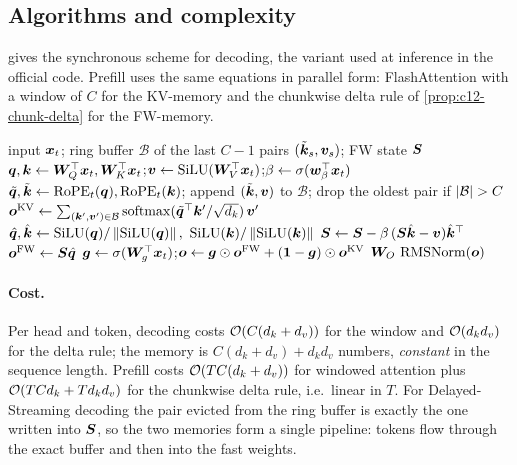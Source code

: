 \subsection{Algorithms and complexity}

 gives the synchronous scheme for decoding, the variant used at inference
in the official code. Prefill uses the same equations in parallel form: FlashAttention with a
window of $C$ for the KV-memory and the chunkwise delta rule of
\cref{prop:c12-chunk-delta} for the FW-memory.

\begin{algorithm}[t]
\caption{One decoding step of a synchronous HQLT head with dynamic vector mixing.}
\label{alg:c12-hqlt}
\begin{algorithmic}[1]
\Require input $\bm{x}_t$; ring buffer $\mathcal{B}$ of the last $C-1$ pairs $(\tilde{\bm{k}}_s,\bm{v}_s)$; FW state $\bm{S}$
\State $\bm{q},\bm{k} \gets \bm{W}_Q^{\top}\bm{x}_t, \bm{W}_K^{\top}\bm{x}_t$;\quad $\bm{v}\gets\operatorname{SiLU}(\bm{W}_V^{\top}\bm{x}_t)$;\quad $\beta\gets\sigma(\bm{w}_\beta^{\top}\bm{x}_t)$
\State $\tilde{\bm{q}},\tilde{\bm{k}} \gets \mathrm{RoPE}_t(\bm{q}), \mathrm{RoPE}_t(\bm{k})$; append $(\tilde{\bm{k}},\bm{v})$ to $\mathcal{B}$; drop the oldest pair if $\left\lvert \mathcal{B}\right\rvert>C$
\State $\bm{o}^{\mathrm{KV}} \gets \sum_{(\bm{k}',\bm{v}')\in\mathcal{B}}\operatorname{softmax}(\tilde{\bm{q}}^{\top}\bm{k}'/\sqrt{d_k})\,\bm{v}'$
\State $\hat{\bm{q}},\hat{\bm{k}} \gets \operatorname{SiLU}(\bm{q})/\left\lVert \operatorname{SiLU}(\bm{q})\right\rVert,\ \operatorname{SiLU}(\bm{k})/\left\lVert \operatorname{SiLU}(\bm{k})\right\rVert$
\State $\bm{S} \gets \bm{S} - \beta\,(\bm{S}\hat{\bm{k}} - \bm{v})\hat{\bm{k}}^{\top}$ \Comment{$=\mS(\mI-\beta\hat\vk\hat\vk\T)+\beta\vv\hat\vk\T$}
\State $\bm{o}^{\mathrm{FW}} \gets \bm{S}\hat{\bm{q}}$
\State $\bm{g}\gets\sigma(\bm{W}_g^{\top}\bm{x}_t)$;\quad $\bm{o} \gets \bm{g}\odot\bm{o}^{\mathrm{FW}} + (\bm1-\bm{g})\odot\bm{o}^{\mathrm{KV}}$
\State \Return $\bm{W}_O\,\operatorname{RMSNorm}(\bm{o})$ 
\end{algorithmic}
\end{algorithm}

\paragraph{Cost.} Per head and token, decoding costs $\mathcal{O}(C(d_k+d_v))$ for the window and
$\mathcal{O}(d_kd_v)$ for the delta rule; the memory is $C(d_k+d_v) + d_kd_v$ numbers, \emph{constant}
in the sequence length. Prefill costs $\mathcal{O}(TC(d_k+d_v))$ for windowed attention plus
$\mathcal{O}(TCd_k + Td_kd_v)$ for the chunkwise delta rule, i.e.\ linear in $T$. For
Delayed-Streaming decoding the pair evicted from the ring buffer is exactly the one written into
$\bm{S}$, so the two memories form a single pipeline: tokens flow through the exact buffer and then
into the fast weights.

